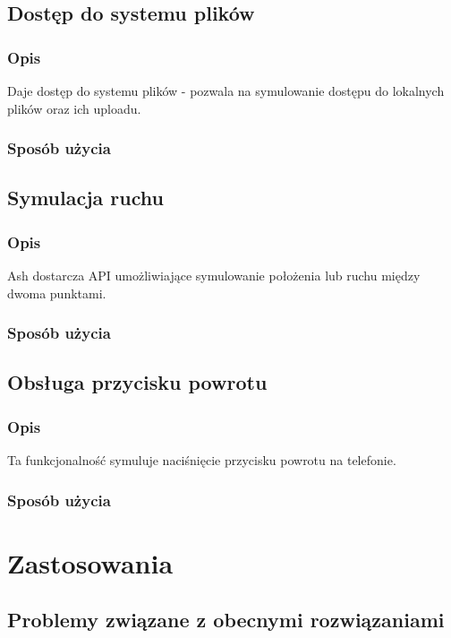 \documentclass[a4paper]{article}
\begin{document}
\subsection{Dostęp do systemu plików}

\subsubsection{Opis}
Daje dostęp do systemu plików - pozwala na symulowanie dostępu do lokalnych plików oraz ich uploadu.

\subsubsection{Sposób użycia}

\subsection{Symulacja ruchu}

\subsubsection{Opis}
Ash dostarcza API umożliwiające symulowanie położenia lub ruchu między dwoma punktami.

\subsubsection{Sposób użycia}

\subsection{Obsługa przycisku powrotu}

\subsubsection{Opis}
Ta funkcjonalność symuluje naciśnięcie przycisku powrotu na telefonie.

\subsubsection{Sposób użycia}

\section{Zastosowania}

\subsection{Problemy związane z obecnymi rozwiązaniami}
\end{document}
